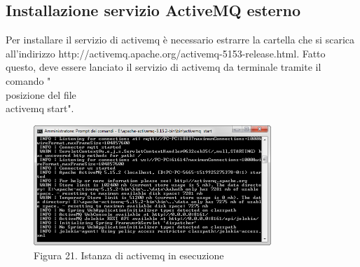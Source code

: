 \subsection{Installazione servizio ActiveMQ esterno}
Per installare il servizio di activemq è necessario estrarre la cartella che si scarica all'indirizzo http://activemq.apache.org/activemq-5153-release.html. Fatto questo, deve essere lanciato il servizio di activemq da terminale tramite il comando "\\posizione del file\\activemq start".
\begin{figure}[h]
	\centering
	\includegraphics[width=0.8\textwidth]{activemq-in-esecuzione.png}
	\caption*{Figura 21. Istanza di activemq in esecuzione}
\end{figure}
